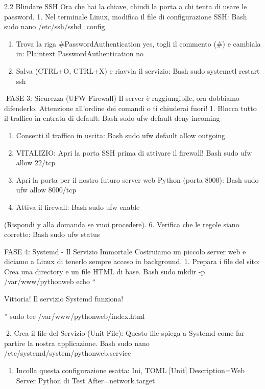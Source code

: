 \documentclass[11pt,a4paper]{article}
\providecommand{\tightlist}{%
  \setlength{\itemsep}{0pt}\setlength{\parskip}{0pt}}
\begin{document}
2.2 Blindare SSH Ora che hai la chiave, chiudi la porta a chi tenta di
usare le password. 1. Nel terminale Linux, modifica il file di
configurazione SSH: Bash sudo nano /etc/ssh/sshd\_config

\begin{enumerate}
\def\labelenumi{\arabic{enumi}.}
\setcounter{enumi}{1}
\item
  Trova la riga \#PasswordAuthentication yes, togli il commento (\#) e
  cambiala in: Plaintext PasswordAuthentication no
\item
  Salva (CTRL+O, CTRL+X) e riavvia il servizio: Bash sudo systemctl
  restart ssh
\end{enumerate}

FASE 3: Sicurezza (UFW Firewall) Il server è raggiungibile, ora dobbiamo
difenderlo. Attenzione all'ordine dei comandi o ti chiuderai fuori! 1.
Blocca tutto il traffico in entrata di default: Bash sudo ufw default
deny incoming

\begin{enumerate}
\def\labelenumi{\arabic{enumi}.}
\setcounter{enumi}{1}
\item
  Consenti il traffico in uscita: Bash sudo ufw default allow outgoing
\item
  VITALIZIO: Apri la porta SSH prima di attivare il firewall! Bash sudo
  ufw allow 22/tcp
\item
  Apri la porta per il nostro futuro server web Python (porta 8000):
  Bash sudo ufw allow 8000/tcp
\item
  Attiva il firewall: Bash sudo ufw enable
\end{enumerate}

(Rispondi y alla domanda se vuoi procedere). 6. Verifica che le regole
siano corrette: Bash sudo ufw status

FASE 4: Systemd - Il Servizio Immortale Costruiamo un piccolo server web
e diciamo a Linux di tenerlo sempre acceso in background. 1. Prepara i
file del sito: Crea una directory e un file HTML di base. Bash sudo
mkdir -p /var/www/pythonweb echo ``

Vittoria! Il servizio Systemd funziona!

'' \textbar{} sudo tee /var/www/pythonweb/index.html

2. Crea il file del Servizio (Unit File): Questo file spiega a Systemd
come far partire la nostra applicazione. Bash sudo nano
/etc/systemd/system/pythonweb.service

\begin{enumerate}
\def\labelenumi{\arabic{enumi}.}
\setcounter{enumi}{2}
\tightlist
\item
  Incolla questa configurazione esatta: Ini, TOML {[}Unit{]}
  Description=Web Server Python di Test After=network.target
\end{enumerate}
\end{document}
